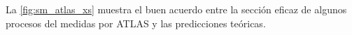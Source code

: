 
La {\fig} \ref{fig:sm_atlas_xs} muestra el buen acuerdo entre la sección eficaz de algunos
procesos del {\SM} medidas por ATLAS y las predicciones
teóricas.

